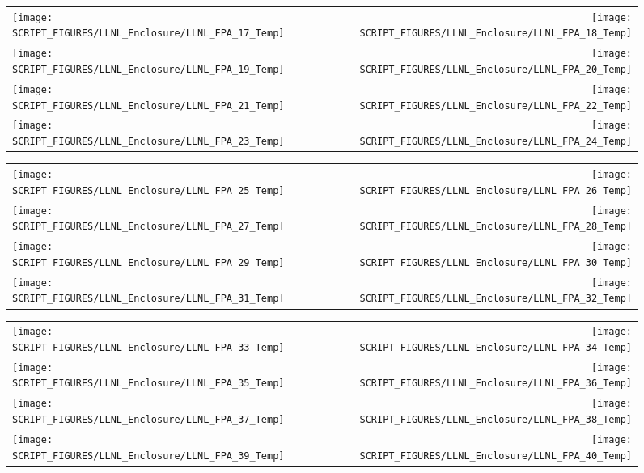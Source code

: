 \begin{figure}[!ht]
\begin{tabular*}{\textwidth}{l@{\extracolsep{\fill}}r}
\texttt{[image: SCRIPT\_FIGURES/LLNL\_Enclosure/LLNL\_FPA\_17\_Temp]} &
\texttt{[image: SCRIPT\_FIGURES/LLNL\_Enclosure/LLNL\_FPA\_18\_Temp]} \\
\texttt{[image: SCRIPT\_FIGURES/LLNL\_Enclosure/LLNL\_FPA\_19\_Temp]} &
\texttt{[image: SCRIPT\_FIGURES/LLNL\_Enclosure/LLNL\_FPA\_20\_Temp]} \\
\texttt{[image: SCRIPT\_FIGURES/LLNL\_Enclosure/LLNL\_FPA\_21\_Temp]} &
\texttt{[image: SCRIPT\_FIGURES/LLNL\_Enclosure/LLNL\_FPA\_22\_Temp]} \\
\texttt{[image: SCRIPT\_FIGURES/LLNL\_Enclosure/LLNL\_FPA\_23\_Temp]} &
\texttt{[image: SCRIPT\_FIGURES/LLNL\_Enclosure/LLNL\_FPA\_24\_Temp]}
\end{tabular*}
\end{figure}

\begin{figure}[!ht]
\begin{tabular*}{\textwidth}{l@{\extracolsep{\fill}}r}
\texttt{[image: SCRIPT\_FIGURES/LLNL\_Enclosure/LLNL\_FPA\_25\_Temp]} &
\texttt{[image: SCRIPT\_FIGURES/LLNL\_Enclosure/LLNL\_FPA\_26\_Temp]} \\
\texttt{[image: SCRIPT\_FIGURES/LLNL\_Enclosure/LLNL\_FPA\_27\_Temp]} &
\texttt{[image: SCRIPT\_FIGURES/LLNL\_Enclosure/LLNL\_FPA\_28\_Temp]} \\
\texttt{[image: SCRIPT\_FIGURES/LLNL\_Enclosure/LLNL\_FPA\_29\_Temp]} &
\texttt{[image: SCRIPT\_FIGURES/LLNL\_Enclosure/LLNL\_FPA\_30\_Temp]} \\
\texttt{[image: SCRIPT\_FIGURES/LLNL\_Enclosure/LLNL\_FPA\_31\_Temp]} &
\texttt{[image: SCRIPT\_FIGURES/LLNL\_Enclosure/LLNL\_FPA\_32\_Temp]}
\end{tabular*}
\end{figure}

\begin{figure}[!ht]
\begin{tabular*}{\textwidth}{l@{\extracolsep{\fill}}r}
\texttt{[image: SCRIPT\_FIGURES/LLNL\_Enclosure/LLNL\_FPA\_33\_Temp]} &
\texttt{[image: SCRIPT\_FIGURES/LLNL\_Enclosure/LLNL\_FPA\_34\_Temp]} \\
\texttt{[image: SCRIPT\_FIGURES/LLNL\_Enclosure/LLNL\_FPA\_35\_Temp]} &
\texttt{[image: SCRIPT\_FIGURES/LLNL\_Enclosure/LLNL\_FPA\_36\_Temp]} \\
\texttt{[image: SCRIPT\_FIGURES/LLNL\_Enclosure/LLNL\_FPA\_37\_Temp]} &
\texttt{[image: SCRIPT\_FIGURES/LLNL\_Enclosure/LLNL\_FPA\_38\_Temp]} \\
\texttt{[image: SCRIPT\_FIGURES/LLNL\_Enclosure/LLNL\_FPA\_39\_Temp]} &
\texttt{[image: SCRIPT\_FIGURES/LLNL\_Enclosure/LLNL\_FPA\_40\_Temp]}
\end{tabular*}
\end{figure}

